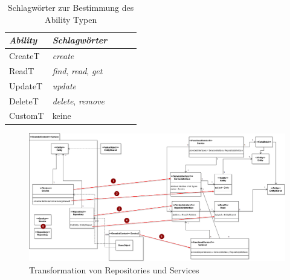\documentclass[
	oneside,  %
	ngerman, 
	final, 
	11pt, 
	a4paper, 
	1.1headlines, 
	headinclude=false, 
	footinclude=false, 
	mpinclude=false, 
	pagesize, 
	onecolumn, 
	titlepage, 
	parskip=half, 
	headsepline, 
	chapterprefix=false, 
	version=first, 
	listof=totoc, 
	bibliography=totoc, 
	toc=graduated, 
	fleqn
]{scrbook}
\begin{document}
\begin{table}
\centering
\begin{tabular}{*5l}   \toprule
\emph{Ability} & \emph{Schlagwörter} \\\midrule
 CreateT    & \textit{create}  \\ 
 ReadT    & \textit{find}, \textit{read}, \textit{get} \\
 UpdateT    & \textit{update} \\ 
 DeleteT    & \textit{delete}, \textit{remove} \\ 
 CustomT & keine \\\bottomrule
 \hline
\end{tabular}
\caption{Schlagwörter zur Bestimmung des Ability Typen}
\end{table}
\begin{figure}
\includegraphics[width=\textwidth]{Bilder/servicesAndRepos.png}
\caption{Transformation von Repositories und Services}
\end{figure}
\end{document}
